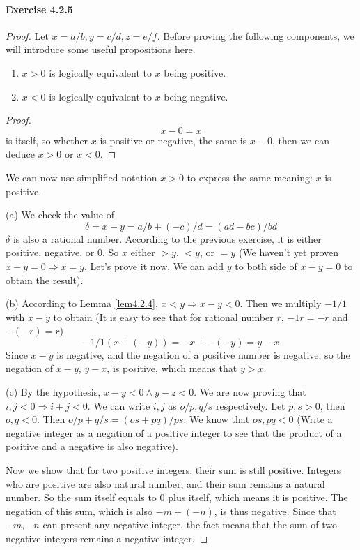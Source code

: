 \paragraph{Exercise 4.2.5} \label{exercise4.2.5}
\begin{proof}
Let $x=a/b,y=c/d,z=e/f$. Before proving the following components, we will introduce some useful 
propositions here.
\begin{lem} \label{lem4.2.4}
\begin{enumerate}
\item $x>0$ is logically equivalent to $x$ being positive.
\item $x<0$ is logically equivalent to $x$ being negative.
\end{enumerate}
\end{lem}
\begin{proof}
\[
x-0 =x
\]
is itself, so whether $x$ is positive or negative, the same is $x-0$, then we can deduce $x>0$ or $x<0$.
\end{proof}

We can now use simplified notation $x>0$ to express the same meaning: $x$ is positive. 

(a)
We check the value of 
\[
\delta = x-y = a/b +(-c)/d = (ad-bc)/bd
\]
$\delta$ is also a rational number. According to the previous exercise, it is either positive, negative, 
or $0$. So $x$ either $>y$, $<y$, or $=y$ (We haven't yet proven $x-y=0 \Longrightarrow x = y$. Let's 
prove it now. We can add $y$ to both side of $x-y=0$ to obtain the result).

(b)
According to Lemma \ref{lem4.2.4}, $x<y \Longrightarrow x-y<0$. Then we multiply $-1/1$ with $x-y$ to 
obtain (It is easy to see that for rational number $r$, $-1r = -r$ and $-(-r)=r$)
\[
-1/1 (x + (-y)) = -x + -(-y) = y - x
\]
Since $x-y$ is negative, and the negation of a positive number is negative, so the negation of $x-y$, 
$y-x$, is positive, which means that $y>x$.

(c)
By the hypothesis, $x-y<0 \wedge y-z<0$. We are now proving that $i,j<0 \Longrightarrow i + j <0$. We can 
write $i,j$ as $o/p,q/s$ respectively. Let $p,s>0$, then $o,q<0$. Then $o/p+q/s = (os+pq)/ps$. We know 
that $os,pq<0$ (Write a negative integer as a negation of a positive integer to see that the product of a 
positive and a negative is also negative). 

Now we show that for two positive integers, their sum is still 
positive. Integers who are positive are also natural number, and their sum remains a natural number. So 
the sum itself equals to $0$ plus itself, which means it is positive. The negation of this sum, which is 
also $-m+(-n)$, is thus negative. Since that $-m,-n$ can present any negative integer, the fact means that 
the sum of two negative integers remains a negative integer.


\end{proof}
